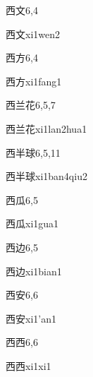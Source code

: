 \begin{entry}{西文}{6,4}
  \begin{phonetics}{西文}{xi1wen2}
  \end{phonetics}
\end{entry}

\begin{entry}{西方}{6,4}
  \begin{phonetics}{西方}{xi1fang1}
  \end{phonetics}
\end{entry}

\begin{entry}{西兰花}{6,5,7}
  \begin{phonetics}{西兰花}{xi1lan2hua1}
  \end{phonetics}
\end{entry}

\begin{entry}{西半球}{6,5,11}
  \begin{phonetics}{西半球}{xi1ban4qiu2}
  \end{phonetics}
\end{entry}

\begin{entry}{西瓜}{6,5}
  \begin{phonetics}{西瓜}{xi1gua1}
  \end{phonetics}
\end{entry}

\begin{entry}{西边}{6,5}
  \begin{phonetics}{西边}{xi1bian1}
  \end{phonetics}
\end{entry}

\begin{entry}{西安}{6,6}
  \begin{phonetics}{西安}{xi1'an1}
  \end{phonetics}
\end{entry}

\begin{entry}{西西}{6,6}
  \begin{phonetics}{西西}{xi1xi1}
  \end{phonetics}
\end{entry}

